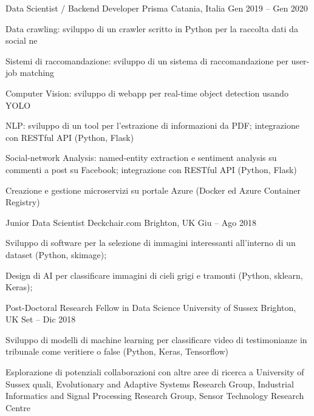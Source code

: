 \begin{cventries}
    \cventry
    {Data Scientist / Backend Developer}
    {Prisma}    
    {Catania, Italia}
    {Gen 2019 -- Gen 2020}
    {
      \begin{cvitems}
        \item {Data crawling: sviluppo di un crawler scritto in Python per la raccolta dati da social ne}
        \item {Sistemi di raccomandazione: sviluppo di un sistema di raccomandazione per user-job matching}
        \item {Computer Vision: sviluppo di webapp per real-time object detection usando YOLO}
        \item {NLP: sviluppo di un tool per l'estrazione di informazioni da PDF; integrazione con RESTful API (Python, Flask)}
        \item {Social-network Analysis: named-entity extraction e sentiment analysis su commenti a post su Facebook; integrazione con RESTful API (Python, Flask)}
        \item {Creazione e gestione microservizi su portale Azure (Docker ed Azure Container Registry)}
      \end{cvitems}
    }

    \cventry
    {Junior Data Scientist}
    {Deckchair.com}
    {Brighton, UK}
    {Giu -- Ago 2018}
    {
      \begin{cvitems}
        \item Sviluppo di software per la selezione di immagini interessanti all'interno di un dataset (Python, skimage);
        \item Design di AI per classificare immagini di cieli grigi e tramonti (Python, sklearn, Keras);
      \end{cvitems}
    }
  \end{cventries}


  \begin{cventries}
    \cventry
    {Post-Doctoral Research Fellow in Data Science}
    {University of Sussex}
    {Brighton, UK}
    {Set -- Dic 2018}
    {
      \begin{cvitems}
        \item Sviluppo di modelli di machine learning per classificare video di testimonianze in tribunale come veritiere o false (Python, Keras, Tensorflow)
        \item Esplorazione di potenziali collaborazioni con altre aree di ricerca a University of Sussex quali, Evolutionary and Adaptive Systems Research Group, Industrial Informatics and Signal Processing Research Group, Sensor Technology Research Centre
      \end{cvitems}
    }
  \end{cventries}

